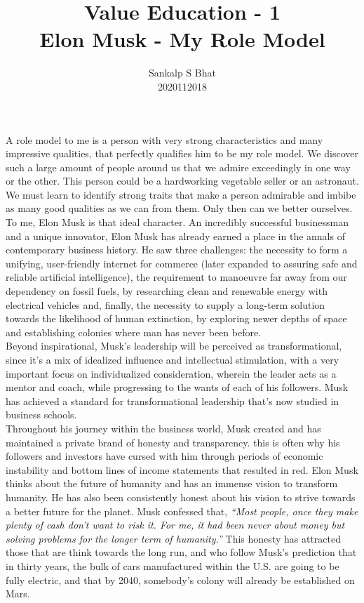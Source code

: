 \documentclass[a4paper, 12pt]{extarticle}
\title{Value Education - 1\\
\bf{Elon Musk - My Role Model}}
\author{Sankalp S Bhat\\
2020112018
}
\begin{document}
\maketitle
\pagestyle{plain}

A role model to me is a person with very strong characteristics and many impressive qualities, that perfectly qualifies him to be my role model. We discover such a large amount of people around us that we admire exceedingly in one way or the other. This person could be a hardworking vegetable seller or an astronaut. We must learn to identify strong traits that make a person admirable and imbibe as many good qualities as we can from them. Only then can we better ourselves.\\


To me, Elon Musk is that ideal character. An incredibly successful businessman and a unique innovator, Elon Musk has already earned a place in the annals of contemporary business history. He saw three challenges: the necessity to form a unifying, user-friendly internet for commerce (later expanded to assuring safe and reliable artificial intelligence), the requirement to manoeuvre far away from our dependency on fossil fuels, by researching clean and renewable energy with electrical vehicles and, finally, the necessity to supply a long-term solution towards the likelihood of human extinction, by exploring newer depths of space and establishing colonies where man has never been before.\\


Beyond inspirational, Musk’s leadership will be perceived as transformational, since it's a mix of idealized influence and intellectual stimulation, with a very important focus on individualized consideration, wherein the leader acts as a mentor and coach, while progressing to the wants of each of his followers. Musk has achieved a standard for transformational leadership that's now studied in business schools.\\


Throughout his journey within the business world, Musk created and has maintained a private brand of honesty and transparency. this is often why his followers and investors have cursed with him through periods of economic instability and bottom lines of income statements that resulted in red. Elon Musk thinks about the future of humanity and has an immense vision to transform humanity. He has also been consistently honest about his vision to strive towards a better future for the planet. Musk confessed that, \textit{“Most people, once they make plenty of cash don’t want to risk it. For me, it had been never about money but solving problems for the longer term of humanity.”} This honesty has attracted those that are think towards the long run, and who follow Musk’s prediction that in thirty years, the bulk of cars manufactured within the U.S. are going to be fully electric, and that by 2040, somebody's colony will already be established on Mars.
\end{document}
